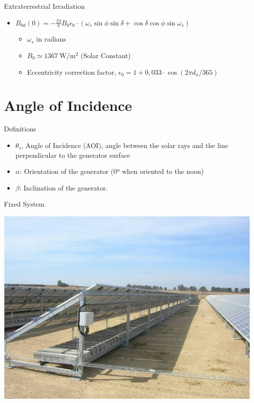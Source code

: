 \documentclass[xcolor={usenames,svgnames,dvipsnames}]{beamer}
\begin{document}
\begin{frame}[label={sec:org6a18b3c}]{Extraterrestrial Irradiation}
\begin{itemize}
\item \(B_{0d}(0)=-\frac{24}{\pi}B_{0}\epsilon_{0}\cdot(\omega_{s}\sin\phi\sin\delta+\cos\delta\cos\phi\sin\omega_{s})\)
\begin{itemize}
\item \(\omega_{s}\) in radians
\item \(B_0 \simeq \SI{1367}{\watt\per\meter\squared}\) (Solar Constant)
\item Eccentricity correction factor, \(\epsilon_0 = 1+0,033\cdot\cos(2\pi d_n/365)\)
\end{itemize}
\end{itemize}
\end{frame}

\section{Angle of Incidence}
\label{sec:org31e47b1}
\begin{frame}[label={sec:orgd83984b}]{Definitions}
\begin{itemize}
\item \(\theta_s\), Angle of Incidence (AOI), angle between the solar rays and the line perpendicular to the generator surface
\item \(\alpha\): Orientation of the generator (0º when oriented to the noon)
\item \(\beta\): Inclination of the generator.
\end{itemize}
\end{frame}

\begin{frame}[label={sec:org582b081}]{Fixed System}
\begin{center}
\includegraphics[width=.9\linewidth]{../figs/EstructuraEstaticaSuelo.jpg}
\end{center}
\end{frame}
\end{document}
